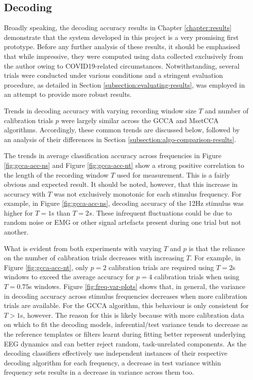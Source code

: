 \subsection{Decoding}
Broadly speaking, the decoding accuracy results in Chapter \ref{chapter:results} demonstrate that the system developed in this project is a very promising first prototype. Before any further analysis of these results, it should be emphasised that while impressive, they were computed using data collected exclusively from the author owing to COVID19-related circumstances. Notwithstanding, several trials were conducted under various conditions and a stringent evaluation procedure, as detailed in Section \ref{subsection:evaluating-results}, was employed in an attempt to provide more robust results. 

Trends in decoding accuracy with varying recording window size $T$ and number of calibration trials $p$ were largely similar across the GCCA and MsetCCA algorithms. Accordingly, these common trends are discussed below, followed by an analysis of their differences in Section \ref{subsection:algo-comparison-results}.

The trends in average classification accuracy across frequencies in Figure \ref{fig:gcca-acc-ns} and Figure \ref{fig:gcca-acc-nt} show a strong positive correlation to the length of the recording window $T$ used for measurement. This is a fairly obvious and expected result. It should be noted, however, that this increase in accuracy with $T$ was not exclusively monotonic for each stimulus frequency. For example, in Figure \ref{fig:gcca-acc-ns}, decoding accuracy of the 12Hz stimulus was higher for $T=1$s than $T=2s$. These infrequent fluctuations could be due to random noise or EMG or other signal artefacts present during one trial but not another. 

What is evident from both experiments with varying $T$ and $p$ is that the reliance on the number of calibration trials decreases with increasing $T$. For example, in Figure \ref{fig:gcca-acc-nt}, only $p=2$ calibration trials are required using $T=2$s windows to exceed the average accuracy for $p=4$ calibration trials when using $T=0.75$s windows. Figure \ref{fig:freq-var-plots} shows that, in general, the variance in decoding accuracy across stimulus frequencies decreases when more calibration trials are available. For the GCCA algorithm, this behaviour is only consistent for $T>1$s, however. The reason for this is likely because with more calibration data on which to fit the decoding models, inferential/test variance tends to decrease as the reference templates or filters learnt during fitting better represent underlying EEG dynamics and can better reject random, task-unrelated components. As the decoding classifiers effectively use independent instances of their respective decoding algorithm for each frequency, a decrease in test variance within frequency sets results in a decrease in variance across them too.


